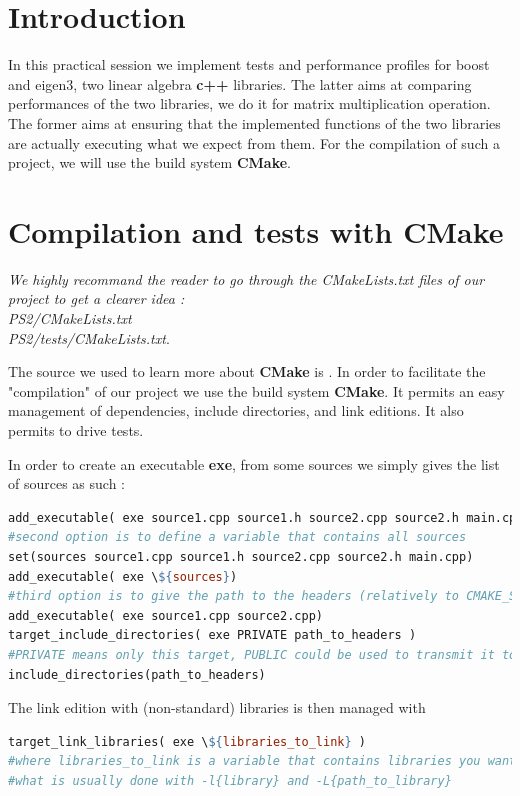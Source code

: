 \usepackage{float} 


\section{Introduction}
In this practical session we implement tests and performance profiles for boost and eigen3, two linear algebra \textbf{c++} libraries. 
The latter aims at comparing performances of the two libraries, we do it for matrix multiplication operation.
The former aims at ensuring that the implemented functions of the two libraries are actually executing what we expect from them.
For the compilation of such a project, we will use the build system \textbf{CMake}.

\section{Compilation and tests with \textbf{CMake}}
\emph{We highly recommand the reader to go through the CMakeLists.txt files of our project to get a clearer idea : \\ 
PS2/CMakeLists.txt \\
PS2/tests/CMakeLists.txt}.

The source we used to learn more about \textbf{CMake} is \cite{ess}.
In order to facilitate the "compilation" of our project we use the build system \textbf{CMake}. It permits an easy management of dependencies, include directories, and link editions. It also permits to drive tests.

In order to create an executable \textbf{exe}, from some sources we simply gives the list of sources as such :
\begin{lstlisting}[language=make, caption=executable creation]
add_executable( exe source1.cpp source1.h source2.cpp source2.h main.cpp)
#second option is to define a variable that contains all sources
set(sources source1.cpp source1.h source2.cpp source2.h main.cpp)
add_executable( exe \${sources})
#third option is to give the path to the headers (relatively to CMAKE_SOURCE_DIR i.e. where the CMakeLists.txt is) like this :
add_executable( exe source1.cpp source2.cpp)
target_include_directories( exe PRIVATE path_to_headers )
#PRIVATE means only this target, PUBLIC could be used to transmit it to transmit it to dependencies or use 
include_directories(path_to_headers)
\end{lstlisting}

The link edition with (non-standard) libraries is then managed with 
\begin{lstlisting}[language=make, caption=executable creation]
target_link_libraries( exe \${libraries_to_link} )
#where libraries_to_link is a variable that contains libraries you want to link
#what is usually done with -l{library} and -L{path_to_library}
\end{lstlisting}

